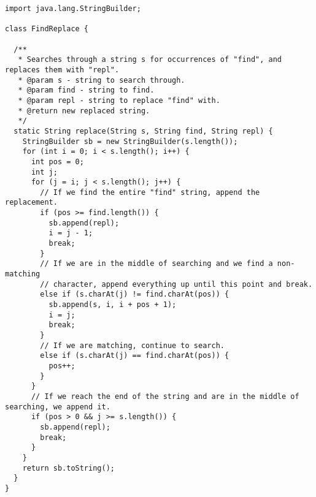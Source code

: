 \begin{lstlisting}[language=MyJava]
import java.lang.StringBuilder;

class FindReplace {

  /**
   * Searches through a string s for occurrences of "find", and replaces them with "repl".
   * @param s - string to search through.
   * @param find - string to find.
   * @param repl - string to replace "find" with.
   * @return new replaced string.
   */
  static String replace(String s, String find, String repl) {
    StringBuilder sb = new StringBuilder(s.length());
    for (int i = 0; i < s.length(); i++) {
      int pos = 0;
      int j;
      for (j = i; j < s.length(); j++) {
        // If we find the entire "find" string, append the replacement.
        if (pos >= find.length()) {
          sb.append(repl);
          i = j - 1;
          break;
        }
        // If we are in the middle of searching and we find a non-matching
        // character, append everything up until this point and break.
        else if (s.charAt(j) != find.charAt(pos)) {
          sb.append(s, i, i + pos + 1);
          i = j;
          break;
        }
        // If we are matching, continue to search.
        else if (s.charAt(j) == find.charAt(pos)) {
          pos++;
        }
      }
      // If we reach the end of the string and are in the middle of searching, we append it.
      if (pos > 0 && j >= s.length()) {
        sb.append(repl);
        break;
      }
    }
    return sb.toString();
  }
}
\end{lstlisting}



